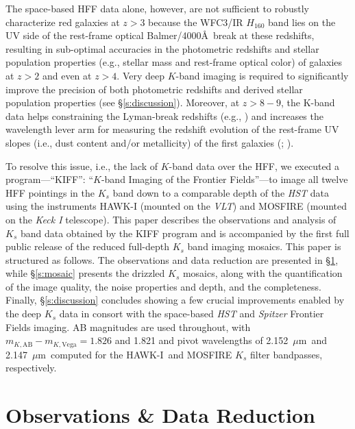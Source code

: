 \documentclass[preprint2]{aastex6}
\gdef\mum{$\mu\mathrm{m}$}
\gdef\HAWKI{\mbox{HAWK-I}}
\begin{document}
The space-based HFF data alone, however, are not sufficient to robustly characterize red galaxies at $z>3$ because the WFC3/IR $H_{160}$ band lies on the UV side of the rest-frame optical Balmer/4000\AA~break at these redshifts, resulting in sub-optimal accuracies in the photometric redshifts and stellar population properties (e.g., stellar mass and rest-frame optical color) of galaxies at $z>2$ and even at $z>4$. Very deep $K$-band imaging is required to significantly improve the precision of both photometric redshifts and derived stellar population properties (see \S\ref{s:discussion}). Moreover, at $z>8-9$, the K-band data helps constraining the Lyman-break redshifts (e.g., \citealt{bouwens:13}) and increases the wavelength lever arm for measuring the redshift evolution of the rest-frame UV slopes (i.e., dust content and/or metallicity) of the first galaxies (\citealt{bouwens:12a}; \citealt{bouwens:13}).

To resolve this issue, i.e., the lack of $K$-band data over the HFF, we executed a program---``KIFF'': ``$K$-band Imaging of the Frontier Fields''---to image all twelve HFF pointings in the $K_s$ band down to a comparable depth of the {\it HST} data using the instruments HAWK-I (mounted on the {\it VLT}) and MOSFIRE (mounted on the {\it Keck I} telescope). This paper describes the observations and analysis of $K_s$ band data obtained by the KIFF program and is accompanied by the first full public release of the reduced full-depth $K_s$ band imaging mosaics. This paper is structured as follows. The observations and data reduction are presented in \S\ref{s:observations}, while \S\ref{s:mosaic} presents the drizzled $K_s$ mosaics, along with the quantification of the image quality, the noise properties and depth, and the completeness. Finally, \S\ref{s:discussion} concludes showing a few crucial improvements enabled by the deep $K_s$ data in consort with the space-based \textit{HST} and \textit{Spitzer} Frontier Fields imaging.  AB magnitudes are used throughout, with $m_{K, \mathrm{AB}} - m_{K, \mathrm{Vega}} = 1.826$ and 1.821 and pivot wavelengths \citep{tokunaga:05} of 2.152~\mum\ and 2.147~\mum\ computed for the \HAWKI\ and MOSFIRE $K_s$ filter bandpasses, respectively. 


\section{Observations \& Data Reduction}
\label{s:observations}
\end{document}
